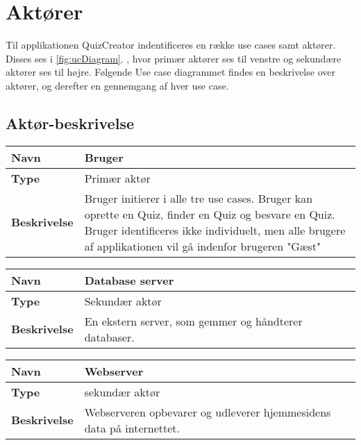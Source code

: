 \section{Aktører}

Til applikationen QuizCreator indentificeres en række use cases samt aktører. Disses ses i \ref{fig:ucDiagram}.
, hvor primær aktører ses til venstre og sekundære aktører ses til højre. Følgende Use case diagrammet findes en beskrivelse over aktører, og derefter en gennemgang af hver use case. 

\subsection{Aktør-beskrivelse}

\begin{tabular}{|p{2cm}|p{12cm}|}

\hline 
\textbf{Navn} & Bruger \\ 
\hline 
\textbf{Type} & Primær aktør \\ 
\hline 
\textbf{Beskrivelse} & Bruger initierer i alle tre use cases. Bruger kan oprette en Quiz, finder en Quiz og besvare en Quiz. Bruger identificeres ikke individuelt, men alle brugere af applikationen vil gå indenfor brugeren "Gæst"\\ 
\hline 

\end{tabular} 

\begin{tabular}{|p{2cm}|p{12cm}|}

\hline 
\textbf{Navn} & Database server \\ 
\hline 
\textbf{Type} & Sekundær aktør \\ 
\hline 
\textbf{Beskrivelse} & En ekstern server, som gemmer og håndterer databaser.\\ 
\hline 

\end{tabular} 

\begin{tabular}{|p{2cm}|p{12cm}|}

\hline 
\textbf{Navn} & Webserver \\ 
\hline 
\textbf{Type} & sekundær aktør \\ 
\hline 
\textbf{Beskrivelse} & Webserveren opbevarer og udleverer hjemmesidens data på internettet.\\ 
\hline 

\end{tabular} 